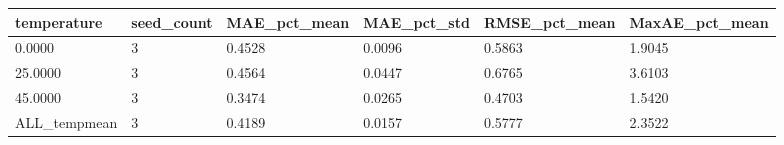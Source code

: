 \begin{tabular}{llllll}
\hline
temperature & seed_count & MAE_pct_mean & MAE_pct_std & RMSE_pct_mean & MaxAE_pct_mean \\
\hline
0.0000 & 3 & 0.4528 & 0.0096 & 0.5863 & 1.9045 \\
25.0000 & 3 & 0.4564 & 0.0447 & 0.6765 & 3.6103 \\
45.0000 & 3 & 0.3474 & 0.0265 & 0.4703 & 1.5420 \\
ALL_tempmean & 3 & 0.4189 & 0.0157 & 0.5777 & 2.3522 \\
\hline
\end{tabular}
